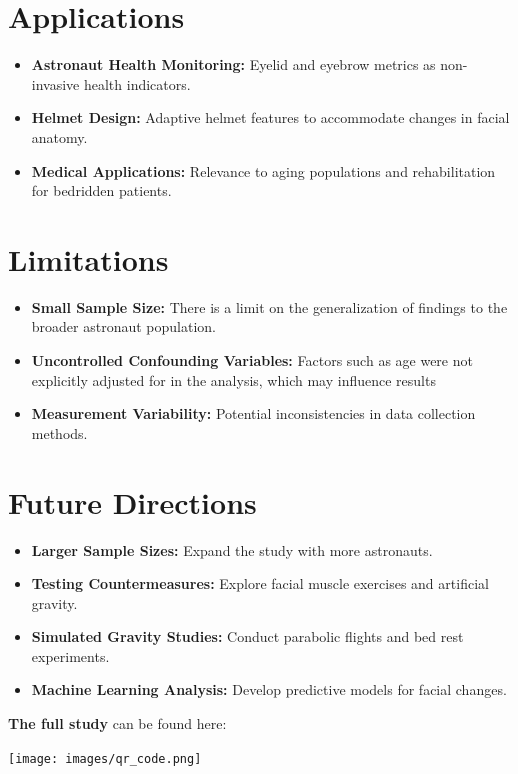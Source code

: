 \documentclass[a0paper,fleqn]{betterposter}
\begin{document}
{%

}{
\section{Applications}
\begin{itemize}
\item \textbf{Astronaut Health Monitoring:} Eyelid and eyebrow metrics as non-invasive health indicators.
\item \textbf{Helmet Design:} Adaptive helmet features to accommodate changes in facial anatomy.
\item \textbf{Medical Applications:} Relevance to aging populations and rehabilitation for bedridden patients.
\end{itemize}

\section{Limitations}
\begin{itemize}
\item \textbf{Small Sample Size:} There is a limit on the generalization of findings to the broader astronaut population.
\item \textbf{Uncontrolled Confounding Variables:} Factors such as age were not explicitly adjusted for in the analysis, which may influence results
\item \textbf{Measurement Variability:} Potential inconsistencies in data collection methods.
\end{itemize} 

\section{Future Directions}
\begin{itemize}
\item \textbf{Larger Sample Sizes:} Expand the study with more astronauts.
\item \textbf{Testing Countermeasures:} Explore facial muscle exercises and artificial gravity.
\item \textbf{Simulated Gravity Studies:}  Conduct parabolic flights and bed rest experiments.
\item \textbf{Machine Learning Analysis:} Develop predictive models for facial changes. \\
\end{itemize} 

\vfill


\textbf{The full study} can be found here:
\begin{center}
\texttt{[image: images/qr\_code.png]}{
}
\end{center}

}
\end{document}
